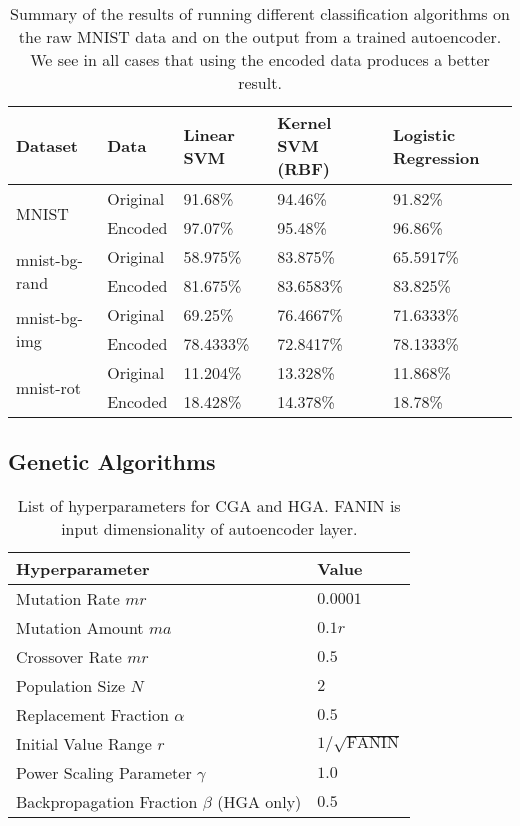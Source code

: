 \begin{table}[h]
	\centering
\begin{tabular}{ll|lll}
    Dataset                        & Data               & Linear SVM & Kernel SVM (RBF) & Logistic Regression \\ \hline
    \multirow{2}{*}{MNIST}         & Original           & 91.68\%    & 94.46\%          & 91.82\%             \\
                                   & Encoded            & 97.07\%    & 95.48\%          & 96.86\%             \\ \hline
    \multirow{2}{*}{mnist-bg-rand} & Original           & 58.975\%   & 83.875\%         & 65.5917\%           \\
                                   & Encoded            & 81.675\%   & 83.6583\%        & 83.825\%            \\ \hline
    \multirow{2}{*}{mnist-bg-img}  & Original           & 69.25\%    & 76.4667\%        & 71.6333\%           \\
                                   & Encoded            & 78.4333\%  & 72.8417\%        & 78.1333\%           \\ \hline
    \multirow{2}{*}{mnist-rot}     & Original           & 11.204\%   & 13.328\%         & 11.868\%           \\
                                   & Encoded            & 18.428\%   & 14.378\%         & 18.78\%
\end{tabular}
	\caption{Summary of the results of running different classification algorithms on the raw MNIST data and on the output from a trained autoencoder. We
	see in all cases that using the encoded data produces a better result.}
	\label{tab:classvsenc}
\end{table}

\subsection{Genetic Algorithms}

\begin{table}[h]
  \centering
\begin{tabular}{l|l}
Hyperparameter     & Value                                                          \\ \hline
Mutation Rate $mr$ & $0.0001$ \\
Mutation Amount $ma$ & $0.1r$ \\
Crossover Rate $mr$ & $0.5$ \\
Population Size $N$ & $2$ \\
Replacement Fraction $\alpha$ & $0.5$ \\
Initial Value Range $r$ & $1/\sqrt{\text{FANIN}}$ \\
Power Scaling Parameter $\gamma$ & $1.0$ \\
Backpropagation Fraction $\beta$ (HGA only) & $0.5$ \\ 

\end{tabular}
\caption{List of hyperparameters for CGA and HGA. FANIN is input dimensionality of autoencoder layer.}
\label{tab:hyperparameters}
\end{table}

